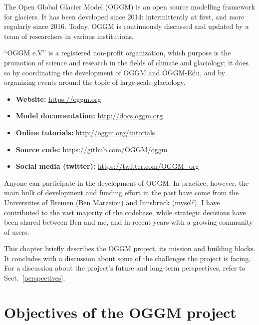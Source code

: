 
The Open Global Glacier Model (OGGM) is an open source modelling framework for glaciers. It has been developed since
2014: intermittently at first, and more regularly since 2016. Today, OGGM is continuously discussed and updated by a
team of researchers in various institutions.

“OGGM e.V” is a registered non-profit organization, which purpose is the promotion of science and research in the fields
of climate and glaciology; it does so by coordinating the development of OGGM and OGGM-Edu, and by organizing events
around the topic of large-scale glaciology.
\begin{itemize}[nosep]
\item {} 
\textbf{Website:} \href{https://oggm.org}{https://oggm.org}

\item {} 
\textbf{Model documentation:} \href{http://docs.oggm.org}{http://docs.oggm.org}

\item {} 
\textbf{Online tutorials:} \href{http://oggm.org/tutorials}{http://oggm.org/tutorials}

\item {} 
\textbf{Source code:} \href{https://github.com/OGGM/oggm}{https://github.com/OGGM/oggm}

\item {} 
\textbf{Social media (twitter):} \href{https://twitter.com/OGGM\_org}{https://twitter.com/OGGM\_org}

\end{itemize}

Anyone can participate in the development of OGGM. In practice, however, the main bulk of development and funding effort
in the past have come from the Universities of Bremen (Ben Marzeion) and Innsbruck (myself). I have contributed to the
vast majority of the codebase, while strategic decisions have been shared between Ben and me, and in recent years with a
growing community of users.

This chapter briefly describes the OGGM project, its mission and building blocks. It concludes with a discussion about
some of the challenges the project is facing. For a discussion about the project’s future and long-term perspectives,
refer to Sect.~\ref{perspectives}.

\clearpage

\section{Objectives of the OGGM project}

